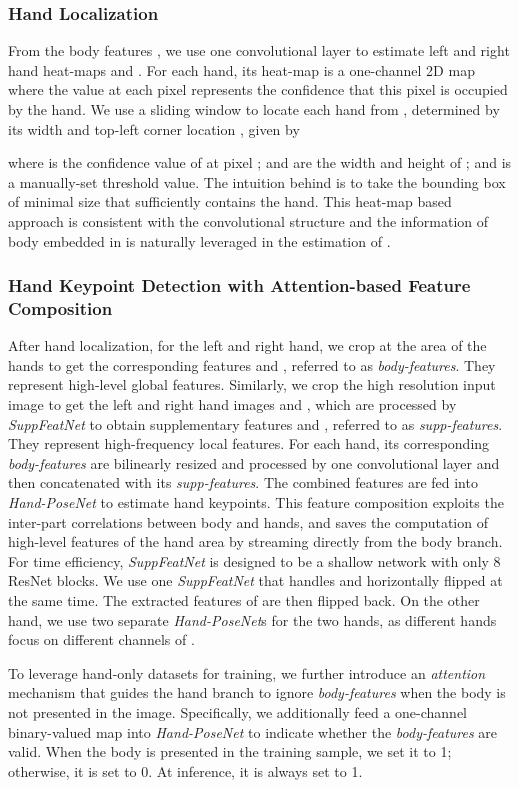 \documentclass[final]{cvpr}
\begin{document}
\subsubsection{Hand Localization \vspace{-1mm}}
From the body features , we use one convolutional layer to estimate left and right hand heat-maps  and .
For each hand, its heat-map  is a one-channel 2D map where the value at each pixel represents the confidence that this pixel is occupied by the hand.
We use a sliding window to locate each hand from , determined by its width  and top-left corner location , given by

where  is the confidence value of  at pixel ;  and  are the width and height of ; and  is a manually-set threshold value.
The intuition behind is to take the bounding box of minimal size that sufficiently contains the hand.
This heat-map based approach is consistent with the convolutional structure and the information of body embedded in  is naturally leveraged in the estimation of .
\par
\vspace{-3mm}
\subsubsection{Hand Keypoint Detection with Attention-based Feature Composition \vspace{-1mm}}
After hand localization, for the left and right hand, we crop  at the area of the hands to get the corresponding features  and , referred to as \textit{body-features}.
They represent high-level global features.
Similarly, we crop the high resolution input image  to get the left and right hand images  and , which are processed by \textit{SuppFeatNet} to obtain supplementary features  and , referred to as \textit{supp-features}.
They represent high-frequency local features.
For each hand, its corresponding \textit{body-features} are bilinearly resized and processed by one convolutional layer and then concatenated with its \textit{supp-features}.
The combined features are fed into \textit{Hand-PoseNet} to estimate hand keypoints.
This feature composition exploits the inter-part correlations between body and hands, and saves the computation of high-level features of the hand area by streaming directly from the body branch.
For time efficiency, \textit{SuppFeatNet} is designed to be a shallow network with only 8 ResNet blocks.
We use one \textit{SuppFeatNet} that handles  and horizontally flipped  at the same time.
The extracted features of  are then flipped back.
On the other hand, we use two separate \textit{Hand-PoseNet}s for the two hands, as different hands focus on different channels of .
\par
To leverage hand-only datasets for training, we further introduce an \textit{attention} mechanism that guides the hand branch to ignore \textit{body-features} when the body is not presented in the image.
Specifically, we additionally feed a one-channel binary-valued map into \textit{Hand-PoseNet} to indicate whether the \textit{body-features} are valid.
When the body is presented in the training sample, we set it to 1; otherwise, it is set to 0.
At inference, it is always set to 1.
\par
\vspace{-3mm}
\end{document}

